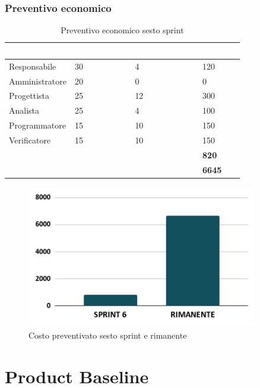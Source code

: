 \subsubsection{Preventivo economico}
{
\setlength{\tabcolsep}{10pt}
\renewcommand{\arraystretch}{1.5}
\begin{table}[h]
    \centering
    \begin{tabularx}{\textwidth}{| l | l | l | X |}
        \hline
        \rowcolor{headerrow} \textbf{\textcolor{white}{Ruolo}} & \textbf{\textcolor{white}{Costo orario}} & \textbf{\textcolor{white}{Ore impiegate}} & \textbf{\textcolor{white}{Costo €}} \\
        \hline
        Responsabile & 30 & 4 & 120\\
        \hline
        Amministratore & 20 & 0 & 0\\
        \hline
        Progettista& 25 & 12 & 300\\
        \hline
        Analista & 25 & 4 & 100\\
        \hline
        Programmatore & 15 & 10 & 150\\
        \hline
        Verificatore & 15 & 10 & 150\\
        \hline
        \cellcolor{headerrow} \textbf{\textcolor{white}{Totale}} &  &  & \textbf{820}\\
        \hline
        \cellcolor{headerrow} \textbf{\textcolor{white}{Rimanente}} &  &  & \textbf{6645}\\
        \hline
    \end{tabularx}
    \caption{Preventivo economico sesto sprint}
    \label{tab:preventivocostisestosprint}
\end{table}
}

\begin{figure}[h!]
    \centering
    \includegraphics[width=0.9\textwidth]{prev6costo.png}
    \caption{Costo preventivato sesto sprint e rimanente}
    \label{fig:preventivocostosestosprint}
\end{figure}


\newpage

\section{Product Baseline}

\newpage
